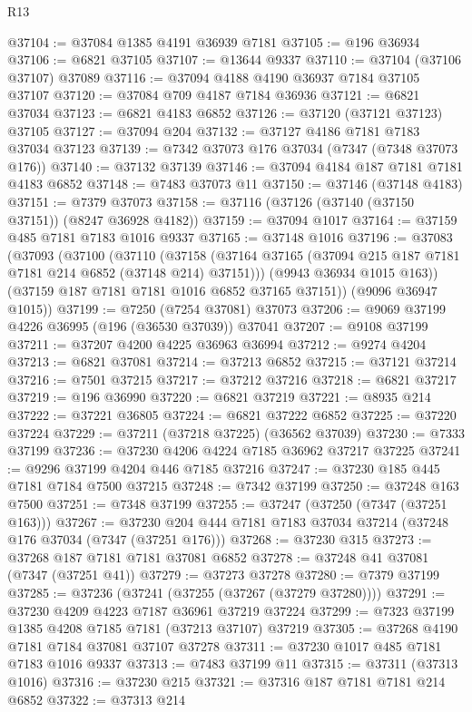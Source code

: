 \begin{lexlean}{R13}
\begin{coremodule}
@37104 := @37084 @1385 @4191 @36939 @7181
@37105 := @196 @36934
@37106 := @6821 @37105
@37107 := @13644 @9337
@37110 := @37104 (@37106 @37107) @37089
@37116 := @37094 @4188 @4190 @36937 @7184 @37105 @37107
@37120 := @37084 @709 @4187 @7184 @36936
@37121 := @6821 @37034
@37123 := @6821 @4183 @6852
@37126 := @37120 (@37121 @37123) @37105
@37127 := @37094 @204
@37132 := @37127 @4186 @7181 @7183 @37034 @37123
@37139 := @7342 @37073 @176 @37034 (@7347 (@7348 @37073 @176))
@37140 := @37132 @37139
@37146 := @37094 @4184 @187 @7181 @7181 @4183 @6852
@37148 := @7483 @37073 @11
@37150 := @37146 (@37148 @4183)
@37151 := @7379 @37073
@37158 := @37116 (@37126 (@37140 (@37150 @37151)) (@8247 @36928 @4182))
@37159 := @37094 @1017
@37164 := @37159 @485 @7181 @7183 @1016 @9337
@37165 := @37148 @1016
@37196 := @37083
    (@37093
      (@37100
        (@37110
          (@37158 (@37164 @37165 (@37094 @215 @187 @7181 @7181 @214 @6852 (@37148 @214) @37151)))
          (@9943 @36934 @1015 @163))
        (@37159 @187 @7181 @7181 @1016 @6852 @37165 @37151))
      (@9096 @36947 @1015))
@37199 := @7250 (@7254 @37081) @37073
@37206 := @9069 @37199 @4226 @36995 (@196 (@36530 @37039)) @37041
@37207 := @9108 @37199
@37211 := @37207 @4200 @4225 @36963 @36994
@37212 := @9274 @4204
@37213 := @6821 @37081
@37214 := @37213 @6852
@37215 := @37121 @37214
@37216 := @7501 @37215
@37217 := @37212 @37216
@37218 := @6821 @37217
@37219 := @196 @36990
@37220 := @6821 @37219
@37221 := @8935 @214
@37222 := @37221 @36805
@37224 := @6821 @37222 @6852
@37225 := @37220 @37224
@37229 := @37211 (@37218 @37225) (@36562 @37039)
@37230 := @7333 @37199
@37236 := @37230 @4206 @4224 @7185 @36962 @37217 @37225
@37241 := @9296 @37199 @4204 @446 @7185 @37216
@37247 := @37230 @185 @445 @7181 @7184 @7500 @37215
@37248 := @7342 @37199
@37250 := @37248 @163 @7500
@37251 := @7348 @37199
@37255 := @37247 (@37250 (@7347 (@37251 @163)))
@37267 := @37230 @204 @444 @7181 @7183 @37034 @37214 (@37248 @176 @37034 (@7347 (@37251 @176)))
@37268 := @37230 @315
@37273 := @37268 @187 @7181 @7181 @37081 @6852
@37278 := @37248 @41 @37081 (@7347 (@37251 @41))
@37279 := @37273 @37278
@37280 := @7379 @37199
@37285 := @37236 (@37241 (@37255 (@37267 (@37279 @37280))))
@37291 := @37230 @4209 @4223 @7187 @36961 @37219 @37224
@37299 := @7323 @37199 @1385 @4208 @7185 @7181 (@37213 @37107) @37219
@37305 := @37268 @4190 @7181 @7184 @37081 @37107 @37278
@37311 := @37230 @1017 @485 @7181 @7183 @1016 @9337
@37313 := @7483 @37199 @11
@37315 := @37311 (@37313 @1016)
@37316 := @37230 @215
@37321 := @37316 @187 @7181 @7181 @214 @6852
@37322 := @37313 @214

\end{coremodule}
\end{lexlean}
